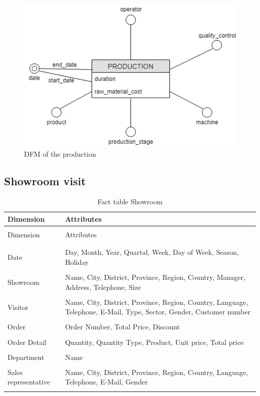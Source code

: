 \documentclass[letterpaper,12pt]{article}
\begin{document}
\begin{figure}[H] 
        \centering
        \includegraphics[scale=0.65]{../images/DFM_Production_Simple.png}
        \caption{
                \label{fig:production}  
                DFM of the production
        }
\end{figure}

\subsection{Showroom visit}

\begingroup
\renewcommand\arraystretch{0.5}
\begin{longtable}{p{3.7cm}p{10cm}}
        \caption{Fact table Showroom} \\
        Dimension & Attributes \\
        \endfirsthead \\
        Dimension & Attributes \\
        \endhead \\
        \hline \\
        Date & Day, Month, Year, Quartal, Week, Day of Week, Season, Holiday \\
        \hline \\
        Showroom & Name, City, District, Province, Region, Country, Manager, Address, Telephone, Size \\
        \hline \\
        Visitor & Name, City, District, Province, Region, Country, Language, Telephone, E-Mail, Type, Sector, Gender, Customer number \\
        \hline \\
        Order & Order Number, Total Price, Discount \\
        \hline \\
        Order Detail & Quantity, Quantity Type, Product, Unit price, Total price \\
        \hline \\
        Department & Name \\
        \hline \\
        Sales representative & Name, City, District, Province, Region, Country, Language, Telephone, E-Mail, Gender \\
        \hline \\
\end{longtable}
\endgroup
\end{document}
